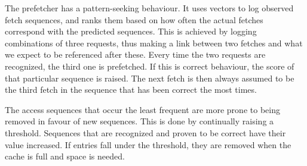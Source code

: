 The prefetcher has a pattern-seeking behaviour. It uses vectors to log observed fetch sequences, and ranks them based on how often the actual fetches correspond with the predicted sequences. This is achieved by logging combinations of three requests, thus making a link between two fetches and what we expect to be referenced after these. Every time the two requests are recognized, the third one is prefetched. If this is correct behaviour, the score of that particular sequence is raised. The next fetch is then always assumed to be the third fetch in the sequence that has been correct the most times.

The access sequences that occur the least frequent are more prone to being removed in favour of new sequences. This is done by continually raising a threshold. Sequences that are recognized and proven to be correct have their value increased. If entries fall under the threshold, they are removed when the cache is full and space is needed.


